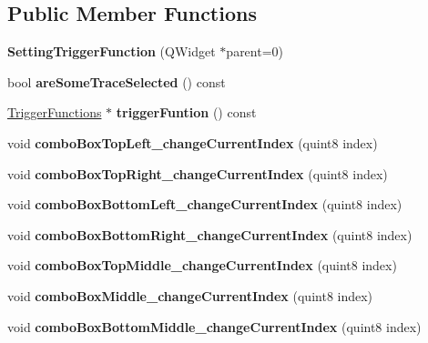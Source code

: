 \subsection*{Public Member Functions}
\begin{DoxyCompactItemize}
\item 
\mbox{\label{class_setting_trigger_function_a2733485253e83e34df25bbbf691b9b87}} 
{\bfseries Setting\+Trigger\+Function} (Q\+Widget $\ast$parent=0)
\item 
\mbox{\label{class_setting_trigger_function_a57fcf9c05feea62c47ac2a040c82dea8}} 
bool {\bfseries are\+Some\+Trace\+Selected} () const
\item 
\mbox{\label{class_setting_trigger_function_aa62a652e3abb499624718d3b30f80505}} 
\hyperlink{class_trigger_functions}{Trigger\+Functions} $\ast$ {\bfseries trigger\+Funtion} () const
\item 
\mbox{\label{class_setting_trigger_function_a48056525880c23709629d8ecae720195}} 
void {\bfseries combo\+Box\+Top\+Left\+\_\+change\+Current\+Index} (quint8 index)
\item 
\mbox{\label{class_setting_trigger_function_a42421130b3fe602d31e9987d1485ba03}} 
void {\bfseries combo\+Box\+Top\+Right\+\_\+change\+Current\+Index} (quint8 index)
\item 
\mbox{\label{class_setting_trigger_function_ab634b106adb8ec4b27b253f55015ed57}} 
void {\bfseries combo\+Box\+Bottom\+Left\+\_\+change\+Current\+Index} (quint8 index)
\item 
\mbox{\label{class_setting_trigger_function_aa425324bba6b7991b3b6b626b8a5606b}} 
void {\bfseries combo\+Box\+Bottom\+Right\+\_\+change\+Current\+Index} (quint8 index)
\item 
\mbox{\label{class_setting_trigger_function_a5935ffb8b13d59514f2c43c92cf09513}} 
void {\bfseries combo\+Box\+Top\+Middle\+\_\+change\+Current\+Index} (quint8 index)
\item 
\mbox{\label{class_setting_trigger_function_ad5c9bf25f21350c4bba70f5786a57d68}} 
void {\bfseries combo\+Box\+Middle\+\_\+change\+Current\+Index} (quint8 index)
\item 
\mbox{\label{class_setting_trigger_function_ae2ae37fb51f610396291dd32227a0932}} 
void {\bfseries combo\+Box\+Bottom\+Middle\+\_\+change\+Current\+Index} (quint8 index)
\end{DoxyCompactItemize}


